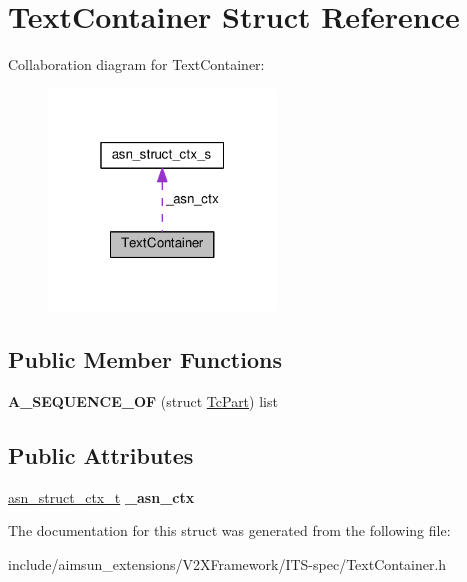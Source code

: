 \hypertarget{structTextContainer}{}\section{Text\+Container Struct Reference}
\label{structTextContainer}


Collaboration diagram for Text\+Container\+:\nopagebreak
\begin{figure}[H]
\begin{center}
\leavevmode
\includegraphics[width=172pt]{structTextContainer__coll__graph}
\end{center}
\end{figure}
\subsection*{Public Member Functions}
\begin{DoxyCompactItemize}
\item 
{\bfseries A\+\_\+\+S\+E\+Q\+U\+E\+N\+C\+E\+\_\+\+OF} (struct \hyperlink{structTcPart}{Tc\+Part}) list\hypertarget{structTextContainer_ad60fd79dbb59df6a7967ebe867c03979}{}\label{structTextContainer_ad60fd79dbb59df6a7967ebe867c03979}

\end{DoxyCompactItemize}
\subsection*{Public Attributes}
\begin{DoxyCompactItemize}
\item 
\hyperlink{structasn__struct__ctx__s}{asn\+\_\+struct\+\_\+ctx\+\_\+t} {\bfseries \+\_\+asn\+\_\+ctx}\hypertarget{structTextContainer_a7539c480fc3ce382a9b78f4abb0d832b}{}\label{structTextContainer_a7539c480fc3ce382a9b78f4abb0d832b}

\end{DoxyCompactItemize}


The documentation for this struct was generated from the following file\+:\begin{DoxyCompactItemize}
\item 
include/aimsun\+\_\+extensions/\+V2\+X\+Framework/\+I\+T\+S-\/spec/Text\+Container.\+h\end{DoxyCompactItemize}
